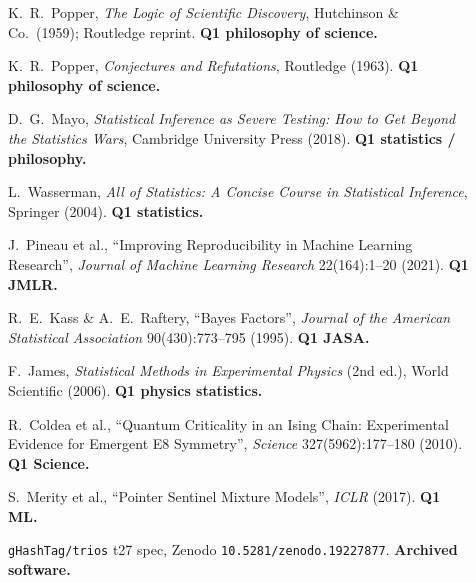 \begin{description}
  \item[\cite{popper1959logic}] K.\ R.\ Popper, \emph{The Logic of Scientific
    Discovery}, Hutchinson \& Co.\ (1959); Routledge reprint.  \textbf{Q1
    philosophy of science.}

  \item[\cite{popper1963conjectures}] K.\ R.\ Popper,
    \emph{Conjectures and Refutations}, Routledge (1963).
    \textbf{Q1 philosophy of science.}

  \item[\cite{mayo2018severe}] D.\ G.\ Mayo, \emph{Statistical Inference as
    Severe Testing: How to Get Beyond the Statistics Wars}, Cambridge University
    Press (2018).  \textbf{Q1 statistics / philosophy.}

  \item[\cite{wasserman2004all}] L.\ Wasserman, \emph{All of Statistics:
    A Concise Course in Statistical Inference}, Springer (2004).
    \textbf{Q1 statistics.}

  \item[\cite{pineau2021improving}] J.\ Pineau et al., ``Improving Reproducibility
    in Machine Learning Research'', \emph{Journal of Machine Learning Research}
    22(164):1--20 (2021).  \textbf{Q1 JMLR.}

  \item[\cite{kass1995bayes}] R.\ E.\ Kass \& A.\ E.\ Raftery, ``Bayes Factors'',
    \emph{Journal of the American Statistical Association} 90(430):773--795
    (1995).  \textbf{Q1 JASA.}

  \item[\cite{james2006statistical}] F.\ James, \emph{Statistical Methods in
    Experimental Physics} (2nd ed.), World Scientific (2006).
    \textbf{Q1 physics statistics.}

  \item[\cite{coldea2010}] R.\ Coldea et al., ``Quantum Criticality in an
    Ising Chain: Experimental Evidence for Emergent E8 Symmetry'',
    \emph{Science} 327(5962):177--180 (2010).  \textbf{Q1 Science.}

  \item[\cite{merity2017pointer}] S.\ Merity et al., ``Pointer Sentinel Mixture
    Models'', \emph{ICLR} (2017).  \textbf{Q1 ML.}

  \item[\cite{t27spec}] \texttt{gHashTag/trios} t27 spec, Zenodo
    \texttt{10.5281/zenodo.19227877}.  \textbf{Archived software.}
\end{description}


